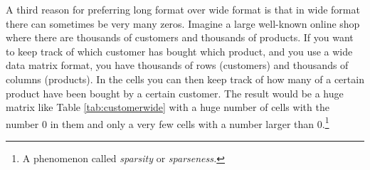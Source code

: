 \documentclass[]{report}\usepackage[]{graphicx}\usepackage[]{color}
\begin{document}
%
%
%
%
%

A third reason for preferring long format over wide format is that in wide format there can sometimes be very many zeros. Imagine a large well-known online shop where there are thousands of customers and thousands of products. If you want to keep track of which customer has bought which product, and you use a wide data matrix format, you have thousands of rows (customers) and thousands of columns (products). In the cells you can then keep track of how many of a certain product have been bought by a certain customer. The result would be a huge matrix like Table \ref{tab:customerwide} with a huge number of cells with the number 0 in them and only a very few cells with a number larger than 0.\footnote{A phenomenon called \textit{sparsity} or \textit{sparseness.}}
\end{document}
